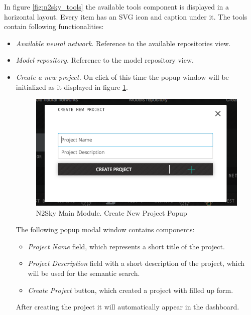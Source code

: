 In figure \ref{fig:n2sky_tools} the available tools component is displayed in a horizontal layout. Every item has an SVG icon and caption under it. The tools contain following functionalities: 
\begin{itemize}
\item \emph{Available neural network.} Reference to the available repositories view.  
\item \emph{Model repository.} Reference to the model repository view.
\item \emph{Create a new project.} On click of this time the popup window will be initialized as it displayed in figure \ref{fig:popupcreatenewproject}.


\begin{figure}[H]
\begin{center}
  \includegraphics[scale=0.5]{components/5/img/popupcreatenewproject.png}
  \caption{N2Sky Main Module. Create New Project Popup}
  \label{fig:popupcreatenewproject}
\end{center}
\end{figure}


The following popup modal window contains components:
\begin{itemize}
\item \emph{Project Name} field, which represents a short title of the project.
\item \emph{Project Description} field with a short description of the project, which will be used for the semantic search.  
\item \emph{Create Project} button, which created a project with filled up form.
\end{itemize}

After creating the project it will automatically appear in the dashboard. 

\end{itemize}

